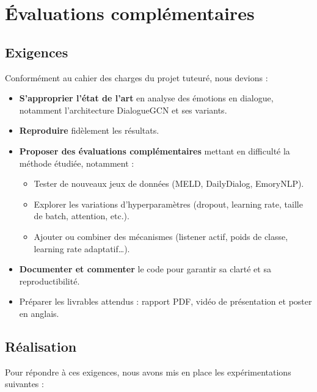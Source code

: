 \documentclass[a4paper,11pt]{article}
\begin{document}

\section{Évaluations complémentaires}

\subsection{Exigences}
Conformément au cahier des charges du projet tuteuré, nous devions :
\begin{itemize}
  \item \textbf{S’approprier l’état de l’art} en analyse des émotions en dialogue, notamment l’architecture DialogueGCN et ses variants.
  \item \textbf{Reproduire} fidèlement les résultats.
  \item \textbf{Proposer des évaluations complémentaires} mettant en difficulté la méthode étudiée, notamment :
    \begin{itemize}
      \item Tester de nouveaux jeux de données (MELD, DailyDialog, EmoryNLP).
      \item Explorer les variations d’hyperparamètres (dropout, learning rate, taille de batch, attention, etc.).
      \item Ajouter ou combiner des mécanismes (listener actif, poids de classe, learning rate adaptatif…).
    \end{itemize}
  \item \textbf{Documenter et commenter} le code pour garantir sa clarté et sa reproductibilité.
  \item Préparer les livrables attendus : rapport PDF, vidéo de présentation et poster en anglais.
\end{itemize}

\subsection{Réalisation}
Pour répondre à ces exigences, nous avons mis en place les expérimentations suivantes :
\end{document}
